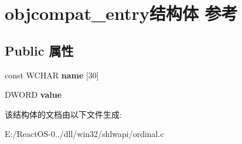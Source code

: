 \hypertarget{structobjcompat__entry}{}\section{objcompat\+\_\+entry结构体 参考}
\label{structobjcompat__entry}
\subsection*{Public 属性}
\begin{DoxyCompactItemize}
\item 
\mbox{\label{structobjcompat__entry_a0c56f1ff6dd47eae4125e340182c84be}} 
const W\+C\+H\+AR {\bfseries name} \mbox{[}30\mbox{]}
\item 
\mbox{\label{structobjcompat__entry_a684293697f97463096e0c0d1779909d9}} 
D\+W\+O\+RD {\bfseries value}
\end{DoxyCompactItemize}


该结构体的文档由以下文件生成\+:\begin{DoxyCompactItemize}
\item 
E\+:/\+React\+O\+S-\/0../dll/win32/shlwapi/ordinal.\+c\end{DoxyCompactItemize}
